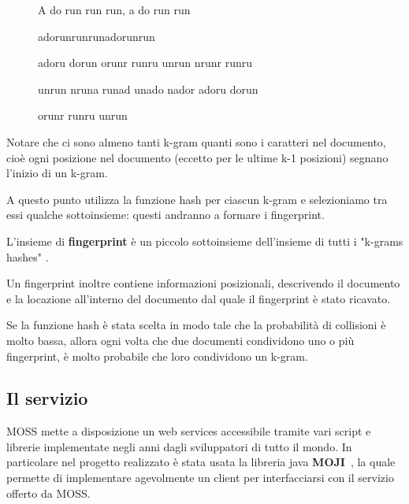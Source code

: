 				\begin{figure}
					{
						\begin{tcolorbox}
							A do run run run, a do run run
						\end{tcolorbox}
					}
					{
						\begin{tcolorbox}
							adorunrunrunadorunrun
						\end{tcolorbox}
					}
					
					{
						\begin{tcolorbox}
							adoru dorun orunr runru unrun nrunr runru
							
							unrun nruna runad unado nador adoru dorun
							
							orunr runru unrun 
						\end{tcolorbox}
					}
					\label{img:fingerprintExample}
				\end{figure}

				Notare che ci sono almeno tanti k-gram quanti sono i caratteri nel documento, cioè ogni posizione nel documento (eccetto per le ultime k-1 posizioni) segnano l'inizio di un k-gram.
				
				A questo punto utilizza la funzione hash per ciascun k-gram e selezioniamo tra essi qualche sottoinsieme: questi andranno a formare i fingerprint. 
				
				L'insieme di \textbf{fingerprint} è un piccolo sottoinsieme dell'insieme di tutti i "k-grams hashes" . 
				
				Un fingerprint inoltre contiene informazioni posizionali, descrivendo il documento e la locazione all'interno del documento dal quale il fingerprint è stato ricavato. 
				
				Se la funzione hash è stata scelta in modo tale che la probabilità di collisioni è molto bassa, allora ogni volta che due documenti condividono uno o più fingerprint, è molto probabile che loro condividono un k-gram. 
			
		\subsection{Il servizio}
			MOSS mette a disposizione un web services accessibile tramite vari script e librerie implementate negli anni dagli sviluppatori di tutto il mondo. In particolare nel progetto realizzato è stata usata la libreria java \textbf{MOJI}~\citep{MOJI}, la quale permette di implementare agevolmente un client per interfacciarsi con il servizio offerto da MOSS.
			
